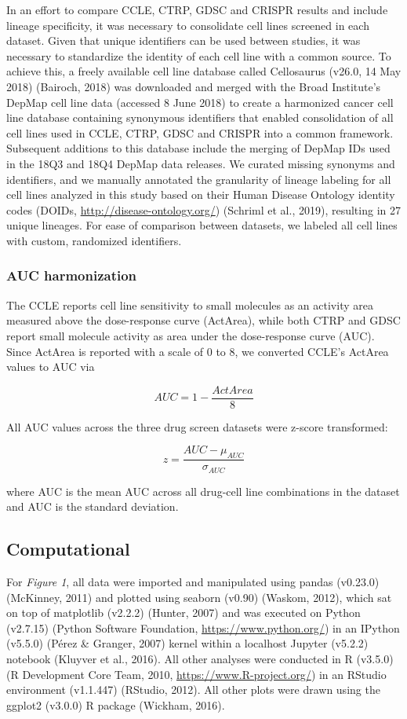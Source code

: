 \documentclass[man,floatsintext]{apa6}
\begin{document}
In an effort to compare CCLE, CTRP, GDSC and CRISPR results and include
lineage specificity, it was necessary to consolidate cell lines screened
in each dataset. Given that unique identifiers can be used between
studies, it was necessary to standardize the identity of each cell line
with a common source. To achieve this, a freely available cell line
database called Cellosaurus (v26.0, 14 May 2018) (Bairoch, 2018) was
downloaded and merged with the Broad Institute's DepMap cell line data
(accessed 8 June 2018) to create a harmonized cancer cell line database
containing synonymous identifiers that enabled consolidation of all cell
lines used in CCLE, CTRP, GDSC and CRISPR into a common framework.
Subsequent additions to this database include the merging of DepMap IDs
used in the 18Q3 and 18Q4 DepMap data releases. We curated missing
synonyms and identifiers, and we manually annotated the granularity of
lineage labeling for all cell lines analyzed in this study based on
their Human Disease Ontology identity codes (DOIDs,
\url{http://disease-ontology.org/}) (Schriml et al., 2019), resulting in
27 unique lineages. For ease of comparison between datasets, we labeled
all cell lines with custom, randomized identifiers.

\subsubsection{AUC harmonization}\label{auc-harmonization}

The CCLE reports cell line sensitivity to small molecules as an activity
area measured above the dose-response curve (ActArea), while both CTRP
and GDSC report small molecule activity as area under the dose-response
curve (AUC). Since ActArea is reported with a scale of 0 to 8, we
converted CCLE's ActArea values to AUC via

\[AUC=1- \frac{ActArea}{8}\]

All AUC values across the three drug screen datasets were z-score
transformed:

\[z = \frac{AUC - \mu_{AUC}}{\sigma_{AUC}}\]

where AUC is the mean AUC across all drug-cell line combinations in the
dataset and AUC is the standard deviation.

\subsection{Computational}\label{computational}

For \emph{Figure 1}, all data were imported and manipulated using pandas
(v0.23.0) (McKinney, 2011) and plotted using seaborn (v0.90) (Waskom,
2012), which sat on top of matplotlib (v2.2.2) (Hunter, 2007) and was
executed on Python (v2.7.15) (Python Software Foundation,
\url{https://www.python.org/}) in an IPython (v5.5.0) (Pérez \& Granger,
2007) kernel within a localhost Jupyter (v5.2.2) notebook (Kluyver et
al., 2016). All other analyses were conducted in R (v3.5.0) (R
Development Core Team, 2010, \url{https://www.R-project.org/}) in an
RStudio environment (v1.1.447) (RStudio, 2012). All other plots were
drawn using the ggplot2 (v3.0.0) R package (Wickham, 2016).
\end{document}
